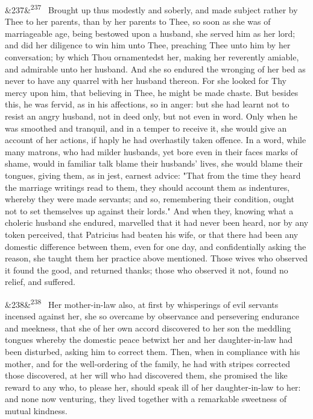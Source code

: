 \documentclass[12pt]{article}
\newcommand{\para}[1][]{\par\noindent\ifx&#1&\else\textsuperscript{\footnotesize #1}~\fi}
\begin{document}
\para[237] Brought up thus modestly and soberly, and made subject rather by Thee to her parents, than by her parents to Thee, so soon as she was of marriageable age, being bestowed upon a husband, she served him as her lord; and did her diligence to win him unto Thee, preaching Thee unto him by her conversation; by which Thou ornamentedst her, making her reverently amiable, and admirable unto her husband. And she so endured the wronging of her bed as never to have any quarrel with her husband thereon. For she looked for Thy mercy upon him, that believing in Thee, he might be made chaste. But besides this, he was fervid, as in his affections, so in anger: but she had learnt not to resist an angry husband, not in deed only, but not even in word. Only when he was smoothed and tranquil, and in a temper to receive it, she would give an account of her actions, if haply he had overhastily taken offence. In a word, while many matrons, who had milder husbands, yet bore even in their faces marks of shame, would in familiar talk blame their husbands' lives, she would blame their tongues, giving them, as in jest, earnest advice: "That from the time they heard the marriage writings read to them, they should account them as indentures, whereby they were made servants; and so, remembering their condition, ought not to set themselves up against their lords." And when they, knowing what a choleric husband she endured, marvelled that it had never been heard, nor by any token perceived, that Patricius had beaten his wife, or that there had been any domestic difference between them, even for one day, and confidentially asking the reason, she taught them her practice above mentioned. Those wives who observed it found the good, and returned thanks; those who observed it not, found no relief, and suffered.

\para[238] Her mother-in-law also, at first by whisperings of evil servants incensed against her, she so overcame by observance and persevering endurance and meekness, that she of her own accord discovered to her son the meddling tongues whereby the domestic peace betwixt her and her daughter-in-law had been disturbed, asking him to correct them. Then, when in compliance with his mother, and for the well-ordering of the family, he had with stripes corrected those discovered, at her will who had discovered them, she promised the like reward to any who, to please her, should speak ill of her daughter-in-law to her: and none now venturing, they lived together with a remarkable sweetness of mutual kindness.
\end{document}
